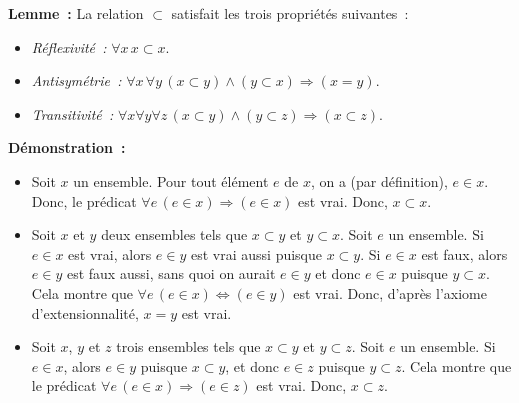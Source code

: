 \done

\medskip

\noindent \textbf{Lemme :} La relation $\subset$ satisfait les trois propriétés suivantes : 
\begin{itemize}[nosep]
    \item \textit{Réflexivité :} $\forall x \, x \subset x$.
    \item \textit{Antisymétrie :} $\forall x \, \forall y \, (x \subset y) \wedge (y \subset x) \Rightarrow (x = y)$.
    \item \textit{Transitivité :} $\forall x \forall y \forall z \, (x \subset y) \wedge (y \subset z) \Rightarrow (x \subset z)$.
\end{itemize}

\medskip

\noindent \textbf{Démonstration :} 
\begin{itemize}[nosep]
    \item Soit $x$ un ensemble. Pour tout élément $e$ de $x$, on a (par définition), $e \in x$. 
        Donc, le prédicat $\forall e \, (e \in x) \Rightarrow (e \in x)$ est vrai.
        Donc, $x \subset x$.
    \item Soit $x$ et $y$ deux ensembles tels que $x \subset y$ et $y \subset x$.
        Soit $e$ un ensemble. 
        Si $e \in x$ est vrai, alors $e \in y$ est vrai aussi puisque $x \subset y$.
        Si $e \in x$ est faux, alors $e \in y$ est faux aussi, sans quoi on aurait $e \in y$ et donc $e \in x$ puisque $y \subset x$.
        Cela montre que $\forall e \, (e \in x) \Leftrightarrow (e \in y)$ est vrai. 
        Donc, d'après l'axiome d'extensionnalité, $x = y$ est vrai.
    \item Soit $x$, $y$ et $z$ trois ensembles tels que $x \subset y$ et $y \subset z$. 
        Soit $e$ un ensemble. 
        Si $e \in x$, alors $e \in y$ puisque $x \subset y$, et donc $e \in z$ puisque $y \subset z$. 
        Cela montre que le prédicat $\forall e \, (e \in x) \Rightarrow (e \in z)$ est vrai.
        Donc, $x \subset z$.
\end{itemize}

\done

\medskip


